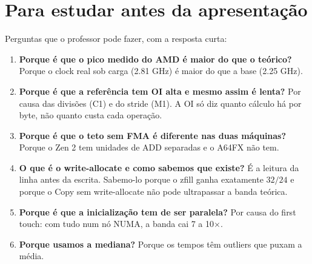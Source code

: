 \documentclass[11pt,a4paper]{article}
\begin{document}
\section{Para estudar antes da apresentação}
Perguntas que o professor pode fazer, com a resposta curta:
\begin{enumerate}
\item \textbf{Porque é que o pico medido do AMD é maior do que o teórico?} Porque o clock real sob carga
(2.81 GHz) é maior do que a base (2.25 GHz).
\item \textbf{Porque é que a referência tem OI alta e mesmo assim é lenta?} Por causa das divisões (C1)
e do stride (M1). A OI só diz quanto cálculo há por byte, não quanto custa cada operação.
\item \textbf{Porque é que o teto sem FMA é diferente nas duas máquinas?} Porque o Zen 2 tem unidades
de ADD separadas e o A64FX não tem.
\item \textbf{O que é o write-allocate e como sabemos que existe?} É a leitura da linha antes da
escrita. Sabemo-lo porque o zfill ganha exatamente $32/24$ e porque o Copy sem write-allocate não pode
ultrapassar a banda teórica.
\item \textbf{Porque é que a inicialização tem de ser paralela?} Por causa do first touch: com tudo num
nó NUMA, a banda cai 7 a 10$\times$.
\item \textbf{Porque usamos a mediana?} Porque os tempos têm outliers que puxam a média.
\end{enumerate}
\end{document}
